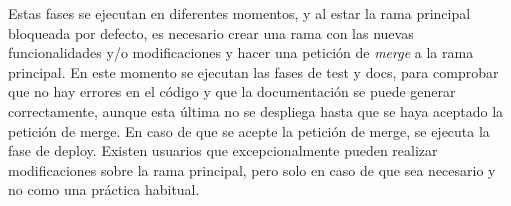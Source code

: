 Estas fases se ejecutan en diferentes momentos, y al estar la rama principal bloqueada
por defecto, es necesario crear una rama con las nuevas funcionalidades y/o modificaciones
y hacer una petición de \textit{merge} a la rama principal. En este momento se ejecutan las fases
de test y docs, para comprobar que no hay errores en el código y que la documentación
se puede generar correctamente, aunque esta última no se despliega hasta que se haya
aceptado la petición de merge. En caso de que se acepte la petición de merge, se ejecuta
la fase de deploy. Existen usuarios que excepcionalmente pueden realizar modificaciones
sobre la rama principal, pero solo en caso de que sea necesario y no como una práctica
habitual. 